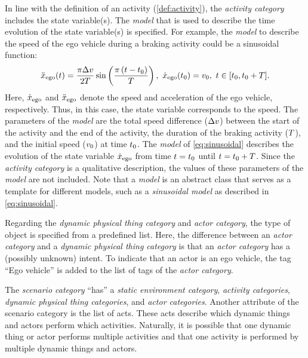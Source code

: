 In line with the definition of an activity (\cref{def:activity}), the \textit{activity category} includes the state variable(s).
The \textit{model} that is used to describe the time evolution of the state  variable(s) is specified. For example, the \textit{model} to describe the speed of the ego vehicle during a braking activity could be a sinusoidal function:
\begin{equation} \label{eq:sinusoidal}
	\egoacceleration(\time) = \frac{\pi \amplitude}{2\duration} \sin \left( \frac{\pi \left( \time - \inittime\right)}{\duration} \right),\ \egospeed(\inittime) = \egospeedinit,\ \time \in [\inittime, \inittime+\duration].
\end{equation}
Here, $\dot{x}_{\mathrm{ego}}$ and $\ddot{x}_{\mathrm{ego}}$ denote the speed and acceleration of the ego vehicle, respectively. Thus, in this case, the state variable corresponds to the speed. 
The parameters of the \textit{model} are the total speed difference ($\Delta v$) between the start of the activity and the end of the activity, the duration of the braking activity ($T$), and the initial speed ($v_{0}$) at time $t_{0}$. 
The \textit{model} of \cref{eq:sinusoidal} describes the evolution of the state variable $\dot{x}_{\mathrm{ego}}$ from time $t=t_{0}$ until $t=t_{0}+T$. Since the \textit{activity category} is a qualitative description, the values of these parameters of the \textit{model} are not included.
\cstartb Note that a \textit{model} is an abstract class that serves as a template for different models, such as a \textit{sinusoidal model} as described in \cref{eq:sinusoidal}. \cendb

Regarding the \cstartb \textit{dynamic physical thing category} and \cendb \textit{actor category}, the type of object is specified from a predefined list. 
\cstartb Here, the difference between an \textit{actor category} and a \textit{dynamic physical thing category} is that an \textit{actor category} has a (possibly unknown) intent. \cendb
To indicate that an actor is an ego vehicle, the tag ``Ego vehicle'' is added to the list of tags of the \textit{actor category}.

The \textit{scenario category} ``has'' a \textit{static environment category}, \textit{activity categories}, \cstartb \textit{dynamic physical thing categories}, \cendb and \textit{actor categories}. 
Another attribute of the scenario category is the list of acts. %
These acts describe which \cstartb dynamic things and \cendb actors perform which activities. Naturally, it is possible that one \cstartb dynamic thing or \cendb actor performs multiple activities and that one activity is performed by multiple \cstartb dynamic things and \cendb actors.

